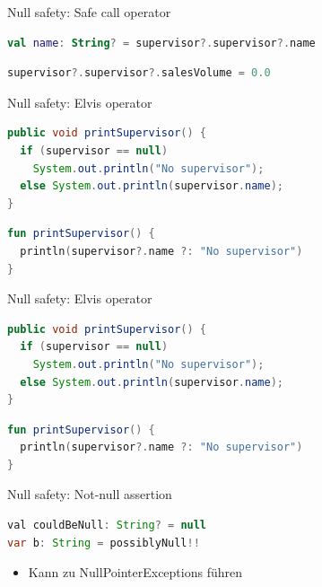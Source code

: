 \documentclass{beamer}
\begin{document}
\begin{frame}[fragile]{Null safety: Safe call operator}
  \begin{lstlisting}[language=Kotlin, title=Verkettung des Operators]
val name: String? = supervisor?.supervisor?.name   
  \end{lstlisting}
  \pause
  \begin{lstlisting}[language=Kotlin, title=Zuweisungen mit dem Operator]
supervisor?.supervisor?.salesVolume = 0.0
  \end{lstlisting}
\end{frame}

\begin{frame}[fragile]{Null safety: Elvis operator}
  \begin{lstlisting}[language=Java]
public void printSupervisor() {
  if (supervisor == null)
    System.out.println("No supervisor");
  else System.out.println(supervisor.name);
}
  \end{lstlisting}
  \pause
  \begin{lstlisting}[language=Kotlin]
fun printSupervisor() {
  println(supervisor?.name ?: "No supervisor")
}
  \end{lstlisting}
\end{frame}

\begin{frame}[fragile]{Null safety: Elvis operator}
  \begin{lstlisting}[language=Java]
public void printSupervisor() {
  if (supervisor == null)
    System.out.println("No supervisor");
  else System.out.println(supervisor.name);
}   
  \end{lstlisting}
  \begin{lstlisting}[language=Kotlin]
fun printSupervisor() {
  println(supervisor?.name ?: "No supervisor")
}
  \end{lstlisting}
\end{frame}

\begin{frame}[fragile]{Null safety: Not-null assertion}
  \begin{lstlisting}[language=Java]
val couldBeNull: String? = null
var b: String = possiblyNull!!
  \end{lstlisting}
  \begin{itemize}
    \item Kann zu NullPointerExceptions führen
  \end{itemize}
\end{frame}
\end{document}
